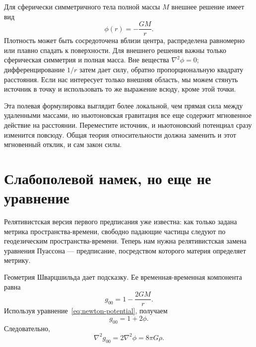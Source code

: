 Для сферически симметричного тела полной массы \(M\) внешнее решение имеет вид
\begin{equation}
 \phi(r)=-\frac{GM}{r}.
 \label{eq:newton-potential}
\end{equation}
Плотность может быть сосредоточена вблизи центра, распределена равномерно или плавно спадать к поверхности. Для внешнего решения важны только сферическая симметрия и полная масса. Вне вещества \(\nabla^2\phi=0\); дифференцирование \(1/r\) затем дает силу, обратно пропорциональную квадрату расстояния. Если нас интересует только внешняя область, мы можем стянуть источник в точку и использовать то же выражение всюду, кроме этой точки.

\begin{classroomqa}
\end{classroomqa}

Эта полевая формулировка выглядит более локальной, чем прямая сила между удаленными массами, но ньютоновская гравитация все еще содержит мгновенное действие на расстоянии. Переместите источник, и ньютоновский потенциал сразу изменится повсюду. Общая теория относительности должна заменить и этот мгновенный отклик, и сам закон силы.

\section{Слабополевой намек, но еще не уравнение}

Релятивистская версия первого предписания уже известна: как только задана метрика пространства-времени, свободно падающие частицы следуют по геодезическим пространства-времени. Теперь нам нужна релятивистская замена уравнения Пуассона — предписание, посредством которого материя определяет метрику.

Геометрия Шварцшильда дает подсказку. Ее временная-временная компонента равна
\begin{equation}
 g_{00}=1-\frac{2GM}{r}.
\end{equation}
Используя уравнение~\eqref{eq:newton-potential}, получаем
\begin{equation}
 g_{00}=1+2\phi.
\end{equation}
Следовательно,
\begin{equation}
 \nabla^2g_{00}=2\nabla^2\phi=8\pi G\rho.
 \label{eq:weak-mnemonic}
\end{equation}

